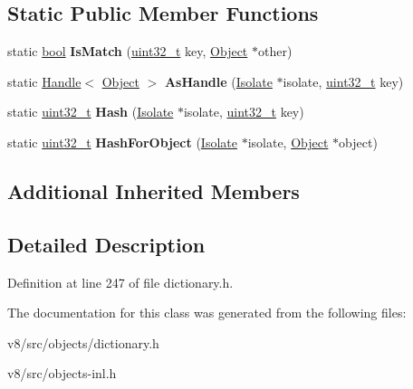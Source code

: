 \subsection*{Static Public Member Functions}
\begin{DoxyCompactItemize}
\item 
\mbox{\label{classv8_1_1internal_1_1NumberDictionaryBaseShape_ab6ea032ee6b64e082b118bbc153a79e7}} 
static \mbox{\hyperlink{classbool}{bool}} {\bfseries Is\+Match} (\mbox{\hyperlink{classuint32__t}{uint32\+\_\+t}} key, \mbox{\hyperlink{classv8_1_1internal_1_1Object}{Object}} $\ast$other)
\item 
\mbox{\label{classv8_1_1internal_1_1NumberDictionaryBaseShape_a58bf8a3af25d6681449e58bb82be841a}} 
static \mbox{\hyperlink{classv8_1_1internal_1_1Handle}{Handle}}$<$ \mbox{\hyperlink{classv8_1_1internal_1_1Object}{Object}} $>$ {\bfseries As\+Handle} (\mbox{\hyperlink{classv8_1_1internal_1_1Isolate}{Isolate}} $\ast$isolate, \mbox{\hyperlink{classuint32__t}{uint32\+\_\+t}} key)
\item 
\mbox{\label{classv8_1_1internal_1_1NumberDictionaryBaseShape_a508e152c55e912fabc17543412a24936}} 
static \mbox{\hyperlink{classuint32__t}{uint32\+\_\+t}} {\bfseries Hash} (\mbox{\hyperlink{classv8_1_1internal_1_1Isolate}{Isolate}} $\ast$isolate, \mbox{\hyperlink{classuint32__t}{uint32\+\_\+t}} key)
\item 
\mbox{\label{classv8_1_1internal_1_1NumberDictionaryBaseShape_a5ac498482e1beab1975edf4d40d2fa83}} 
static \mbox{\hyperlink{classuint32__t}{uint32\+\_\+t}} {\bfseries Hash\+For\+Object} (\mbox{\hyperlink{classv8_1_1internal_1_1Isolate}{Isolate}} $\ast$isolate, \mbox{\hyperlink{classv8_1_1internal_1_1Object}{Object}} $\ast$object)
\end{DoxyCompactItemize}
\subsection*{Additional Inherited Members}


\subsection{Detailed Description}


Definition at line 247 of file dictionary.\+h.



The documentation for this class was generated from the following files\+:\begin{DoxyCompactItemize}
\item 
v8/src/objects/dictionary.\+h\item 
v8/src/objects-\/inl.\+h\end{DoxyCompactItemize}
